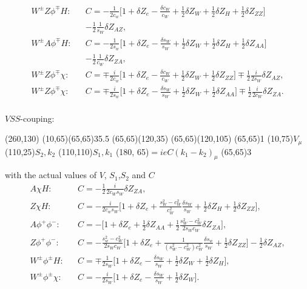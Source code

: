 \begin{eqnarray}
W^\pm Z\phi^\mp H:&& C=-\frac{1}{2c_w}\biggl[ 1+\delta Z_e-\frac{\delta c_W}{c_W}+\frac{1}{2}\delta Z_W+\frac{1}{2}\delta Z_H+\frac{1}{2}\delta Z_{ZZ}\biggr]\nonumber\\
&&-\frac{1}{2}\frac{1}{s_W}\delta Z_{AZ} ,\nonumber\\
W^\pm A\phi^\mp H:&& C=-\frac{1}{2s_w}\biggl[ 1+\delta Z_e-\frac{\delta s_W}{s_W}+\frac{1}{2}\delta Z_W+\frac{1}{2}\delta Z_H+\frac{1}{2}\delta Z_{AA} \biggr]\nonumber\\
&&-\frac{1}{2}\frac{1}{c_W}\delta Z_{ZA},\nonumber\\
W^\pm Z\phi^\mp \chi:&& C=\mp\frac{i}{2c_w}\biggl[ 1+\delta Z_e-\frac{\delta c_W}{c_W}+\frac{1}{2}\delta Z_W+\frac{1}{2}\delta Z_{ZZ} \biggr]\mp\frac{1}{2}\frac{i}{2s_W}\delta Z_{AZ},\nonumber\\
W^\pm Z\phi^\mp \chi:&& C=\mp\frac{i}{2s_w}\biggl[ 1+\delta Z_e-\frac{\delta s_W}{s_W}+\frac{1}{2}\delta Z_W+\frac{1}{2}\delta Z_{AA} \biggr]\mp\frac{1}{2}\frac{i}{2c_W}\delta Z_{ZA}.\nonumber\\
\end{eqnarray}

$VSS$-couping:

\begin{axopicture}(260,130) %
	\Photon(10,65)(65,65){3}{5.5}
	\Line[dash](65,65)(120,35)
	\Line[dash](65,65)(120,105)
	\Vertex(65,65){1}		
	\Text(10,75){$V_\mu$}
	\Text(110,25){$S_2,k_2$}
	\Text(110,110){$S_1,k_1$}
	\Text(180, 65){$=ieC(k_1-k_2)_\mu$}
	\Vertex(65,65){3}
\end{axopicture}
\newline with the actual values of $V$, $S_1$,$S_2$ and $C$
\begin{eqnarray}
A\chi H:&& C=-\frac{1}{2}\frac{i}{2c_Ws_W}\delta Z_{ZA},\nonumber\\
Z\chi H:&& C=-\frac{i}{2c_ws_W}\biggl[ 1+\delta Z_e+\frac{s^2_W-c^2_W}{c^2_W}\frac{\delta s_W}{s_W}+\frac{1}{2}\delta Z_H+\frac{1}{2}\delta Z_{ZZ} \biggr],\nonumber\\
A\phi^+\phi^-:&& C=-\biggl[ 1+\delta Z_e+\frac{1}{2}\delta Z_{AA}+\frac{1}{2}\frac{s^2_W-c^2_W}{2s_Wc_W}\delta Z_{ZA} \biggr],\nonumber\\
Z\phi^+\phi^-:&& C=-\frac{s^2_w-c^2_W}{2s_Wc_W}\biggl[ 1+\delta Z_e+\frac{1}{(s^2_W-c^2_W)c^2_W}\frac{\delta s_w}{s_W}+\frac{1}{2}\delta Z_{ZZ} \biggr]-\frac{1}{2}\delta Z_{AZ},\nonumber\\
W^\pm\phi^\pm H:&& C=\mp\frac{1}{2s_W}\biggl[ 1+\delta Z_e-\frac{\delta s_W}{s_W}+\frac{1}{2}\delta Z_W+\frac{1}{2}\delta Z_H \biggr],\nonumber\\
W^\pm\phi^\pm \chi:&& C=-\frac{i}{2s_W}\biggl[ 1+\delta Z_e-\frac{\delta s_W}{s_W}+\frac{1}{2}\delta Z_W \biggr].\nonumber\\
\end{eqnarray}

